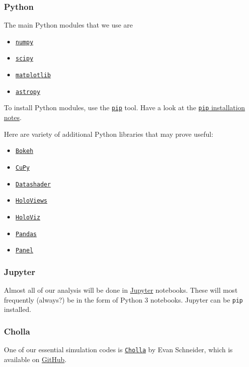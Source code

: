 \subsubsection{Python}
\label{sec:python}

The main Python modules that we use are
\begin{itemize}
	\item \href{https://numpy.org}{\tt numpy}
	\item \href{https://www.scipy.org}{\tt scipy}
	\item \href{https://matplotlib.org}{\tt matplotlib}
	\item \href{https://www.astropy.org}{\tt astropy}
\end{itemize}

\noindent
To install Python modules, use the \href{https://pypi.org/project/pip/}{\tt pip} tool. Have a look at the \href{https://pip.pypa.io/en/stable/installing/}{{\tt pip} installation notes}.


Here are variety of additional Python libraries that may prove useful:
\begin{itemize}
	\item \href{https://bokeh.org/}{\tt Bokeh}
	\item \href{https://cupy.dev/}{\tt CuPy}
	\item \href{https://datashader.org/}{\tt Datashader}
	\item \href{https://holoviews.org/}{\tt HoloViews}
	\item \href{https://holoviz.org/}{\tt HoloViz}
	\item \href{https://pandas.pydata.org/}{\tt Pandas}	
	\item \href{https://panel.holoviz.org/}{\tt Panel}	
\end{itemize}

\subsubsection{Jupyter}
\label{sec:jupyter}

Almost all of our analysis will be done in \href{https://jupyter.org/}{Jupyter} notebooks. These will most frequently (always?) be in the form of Python 3 notebooks. Jupyter can be {\tt pip} installed.

\subsubsection{Cholla}
\label{sec:cholla}

One of our essential simulation codes is \href{https://github.com/cholla-hydro/cholla}{{\tt Cholla}} by Evan Schneider, which is available on \href{https://github.com}{GitHub}.

